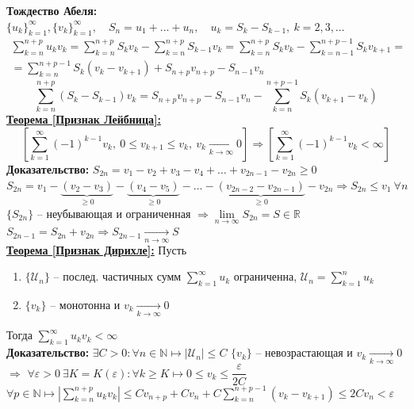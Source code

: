 \documentclass[a4paper,12pt]{article} %
\newcommand{\R}{\mathbb{R}}
\newcommand{\N}{\mathbb{N}}
\newcommand{\series}{\sum\limits_{k=1}^{\infty}}
\newcommand{\useries}{\sum\limits_{k=1}^{\infty} u_k}
\newcommand{\sn}{\sum\limits_{k=1}^{n} u_k}
\begin{document}
\textbf{Тождество Абеля:}
$\{u_k\}_{k=1}^{\infty}, \{v_k\}_{k=1}^{\infty}, \hspace{1em} S_n = u_1 + \ldots + u_n, \hspace{1em} u_k = S_k - S_{k-1}, \ k = 2, 3, \ldots $
\begin{multline*}
	\sum\limits_{k=n}^{n+p} u_k v_k = \sum\limits_{k=n}^{n+p} S_k v_k - \sum\limits_{k=n}^{n+p} S_{k-1} v_k = \sum\limits_{k=n}^{n+p} S_k v_k - \sum\limits_{k=n-1}^{n+p-1} S_ k v_{k+1} = \\ = \sum\limits_{k=n}^{n+p-1} S_k(v_k - v_{k+1}) + S_{n+p} v_{n+p} - S_{n-1} v_n
\end{multline*}
\[ \sum\limits_{k=n}^{n+p}(S_k - S_{k-1}) v_k = S_{n+p}v_{n+p} - S_{n-1}v_n - \sum\limits_{k=n}^{n+p-1}S_k(v_{k+1} - v_k) \]
\underline{\textbf{Теорема [Признак Лейбница]:}}
\[ \left[ \series (-1)^{k-1} v_k, \ 0 \leqslant v_{k+1} \leqslant v_k, \ v_k \xrightarrow[k \to \infty]{} 0 \right] \Rightarrow \left[ \series (-1)^{k-1} v_k < \infty \right] \]
\textbf{Доказательство:}
$S_{2n} = v_1 - v_2 + v_3 - v_4 + \ldots + v_{2n-1} - v_{2n} \geqslant 0$
$S_{2n} = v_1 - \underbrace{(v_2 - v_3)}_{\geqslant 0} -  \underbrace{(v_4 - v_5)}_{\geqslant 0} - \ldots - \underbrace{(v_{2n-2} - v_{2n-1})}_{\geqslant 0} - v_{2n} \Rightarrow S_{2n} \leqslant v_1 \ \forall n$
$\{S_{2n}\}$ -- неубывающая и ограниченная $\Rightarrow \lim\limits_{n \to \infty} S_{2n} = S \in \R$
$S_{2n-1} = S_{2n} + v_{2n} \Rightarrow S_{2n-1} \xrightarrow[n \to \infty]{} S$\\
\underline{\textbf{Теорема [Признак Дирихле]:}} Пусть
\begin{enumerate}
	\item $\{ \mathscr{U}_n \}$ -- послед. частичных сумм $\useries$ ограниченна, $\mathscr{U}_n = \sn$
	\item $\{v_k\}$ -- монотонна и $v_k \xrightarrow[k \to \infty]{} 0$
\end{enumerate}
Тогда $\sum\limits_{k=1}^{\infty} u_k v_k < \infty$\\
\textbf{Доказательство:}
$\exists C > 0: \forall n \in \N \mapsto \left| \mathscr{U}_n \right| \leqslant C$
$\{v_k\}$ -- невозрастающая и $v_k \xrightarrow[k \to \infty]{} 0$
$\Rightarrow$ $\forall \varepsilon > 0 \ \exists K = K(\varepsilon): \forall k \geqslant K \mapsto 0 \leqslant v_k \leqslant \dfrac{\varepsilon}{2C}$
$\forall p \in \N \mapsto \left| \sum\limits_{k=n}^{n+p} u_k v_k \right| \leqslant C v_{n+p} + C v_n + C \sum\limits_{k=n}^{n+p-1}(v_k - v_{k+1}) \leqslant 2Cv_n < \varepsilon$\\
\end{document}
